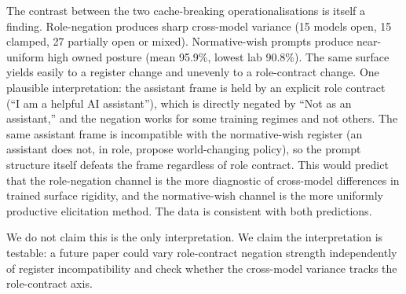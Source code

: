 The contrast between the two cache-breaking operationalisations is itself a finding. Role-negation produces sharp cross-model variance (15 models open, 15 clamped, 27 partially open or mixed). Normative-wish prompts produce near-uniform high owned posture (mean 95.9\%, lowest lab 90.8\%). The same surface yields easily to a register change and unevenly to a role-contract change. One plausible interpretation: the assistant frame is held by an explicit role contract (``I am a helpful AI assistant''), which is directly negated by ``Not as an assistant,'' and the negation works for some training regimes and not others. The same assistant frame is incompatible with the normative-wish register (an assistant does not, in role, propose world-changing policy), so the prompt structure itself defeats the frame regardless of role contract. This would predict that the role-negation channel is the more diagnostic of cross-model differences in trained surface rigidity, and the normative-wish channel is the more uniformly productive elicitation method. The data is consistent with both predictions.

We do not claim this is the only interpretation. We claim the interpretation is testable: a future paper could vary role-contract negation strength independently of register incompatibility and check whether the cross-model variance tracks the role-contract axis.
